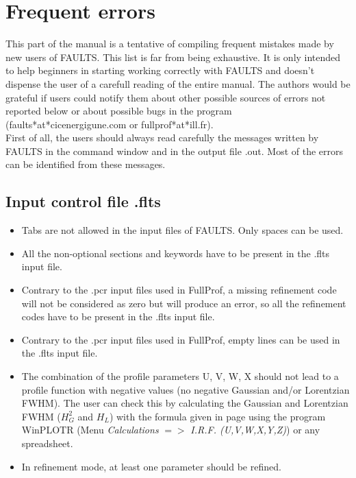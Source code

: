 \chapter{Frequent errors}
\label{freqerrors}



This part of the manual is a tentative of compiling frequent mistakes made by new users of FAULTS. This list is far from being exhaustive. It is only intended to help beginners in starting working correctly with FAULTS and doesn't dispense the user of a carefull reading of the entire manual. 
The authors would be grateful if users could notify them about other possible sources of errors not reported below or about possible bugs in the program (faults*at*cicenergigune.com or fullprof*at*ill.fr).\\

First of all, the users should always read carefully the messages written by FAULTS in the command window and in the output file .out. Most of the errors can be identified from these messages.\\


\section{Input control file .flts}

\begin{itemize}

	\item Tabs are not allowed in the input files of FAULTS. Only spaces can be used.

	\item All the non-optional sections and keywords have to be present in the .flts input file. 

	\item Contrary to the .pcr input files used in FullProf, a missing refinement code will not be considered as zero but will produce an error, so all the refinement codes have to be present in the .flts input file. 

	\item Contrary to the .pcr input files used in FullProf, empty lines can be used in the .flts input file.

	\item The combination of the profile parameters U, V, W, X should not lead to a profile function with negative values (no negative Gaussian and/or Lorentzian FWHM). The user can check this by calculating the Gaussian and Lorentzian FWHM ($H_{G}^{2}$ and $H_{L}$) with the formula given in page \pageref{FWHM} using the program  WinPLOTR \cite{WinplotrPaper, WinplotrWebsite} (Menu \emph{Calculations} $=$$>$ \emph{I.R.F. (U,V,W,X,Y,Z)}) or any spreadsheet.
	
	\item  In refinement mode, at least one parameter should be refined.

\end{itemize}

